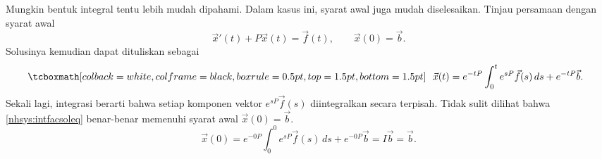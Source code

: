 Mungkin bentuk integral tentu lebih mudah dipahami.  Dalam kasus ini,
syarat awal juga mudah diselesaikan.
Tinjau
persamaan dengan syarat awal
\begin{equation*}
{\vec{x}}'(t) + P\vec{x}(t) = \vec{f}(t) ,
\qquad \vec{x}(0) = \vec{b} .
\end{equation*}
Solusinya kemudian dapat dituliskan sebagai
\begin{equation} \label{nhsys:intfacsoleq}
\mybxbg{~~
\vec{x}(t) = e^{-tP} \int_0^t e^{sP}\vec{f}(s) \, ds + e^{-tP} \vec{b} .
~~}
\end{equation}
Sekali lagi, integrasi berarti bahwa setiap komponen vektor 
$e^{sP}\vec{f}(s)$ diintegralkan secara terpisah.
Tidak sulit dilihat bahwa \eqref{nhsys:intfacsoleq} benar-benar memenuhi
syarat awal $\vec{x}(0) = \vec{b}$.
\begin{equation*}
\vec{x}(0) = e^{-0P} \int_0^0 e^{sP}\vec{f}(s) \, ds + e^{-0P} \vec{b}
= I \vec{b} = \vec{b} .
\end{equation*}

